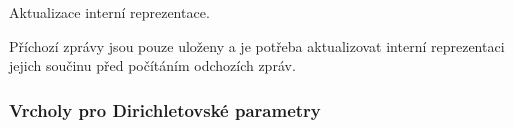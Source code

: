 \begin{fulllineitems}

\begin{fulllineitems}
\label{alex.infer:alex.infer.factor.alex.infer.node.DiscreteFactorNode.update}
Aktualizace interní reprezentace.

Příchozí zprávy jsou pouze uloženy a je potřeba aktualizovat interní
reprezentaci jejich součinu před počítáním odchozích zpráv.

\end{fulllineitems}


\end{fulllineitems}



\subsubsection{Vrcholy pro Dirichletovské parametry}
\label{alex.infer:vrcholy-pro-dirichletovske-parametry}

